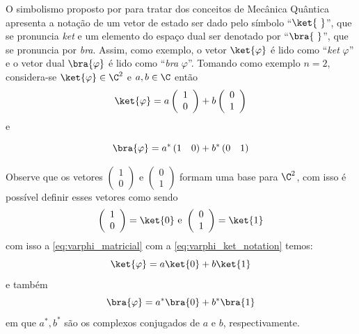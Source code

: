 O simbolismo proposto por \textcite{dirac1981principles} para tratar dos conceitos de Mecânica Quântica apresenta a notação de um vetor de estado ser dado pelo símbolo ``$\ket{\ }$'', que se pronuncia \textit{ket} e um elemento do espaço dual ser denotado por ``$\bra{\ }$'', que se pronuncia por \textit{bra}. Assim, como exemplo, o vetor $\ket{\varphi}$ é lido como ``\textit{ket} $\varphi$'' e o vetor dual $\bra{\varphi}$ é lido como ``\textit{bra} $\varphi$''. Tomando como exemplo $n=2$, considera-se $\ket{\varphi}\in\C^2$ e $a,b\in\C$ então
\begin{equation}\label{eq:varphi_matricial}
    \ket{\varphi}=a\left(\begin{array}{c}
         1 \\ 
         0
    \end{array}\right)+b\left(\begin{array}{c}
         0 \\
         1
    \end{array}\right)
\end{equation}
\noindent e 

\begin{equation}\label{eq:bra_varphi_matricial}
\bra{\varphi}=a^*\left(1\quad 0\right) + b^*\left(0\quad 1\right)
\end{equation}

Observe que os vetores $\left(\begin{array}{c}
         1 \\ 
         0
    \end{array}\right)$ e $\left(\begin{array}{c}
         0 \\
         1
    \end{array}\right)$ formam uma base para $\C^2$, com isso é possível definir esses vetores como sendo
\begin{equation}\label{eq:varphi_ket_notation}
\left(\begin{array}{c}
     1 \\
     0
\end{array}\right)=\ket{0}\text{ e }\left(\begin{array}{c}
     0 \\
     1
\end{array}\right)=\ket{1}
\end{equation}
com isso a \autoref{eq:varphi_matricial} com a \autoref{eq:varphi_ket_notation} temos:
$$\ket{\varphi}=a\ket{0}+b\ket{1}$$
\noindent e também 
$$\bra{\varphi}=a^*\bra{0}+b^*\bra{1}$$
\noindent em que $a^*, b^*$ são os complexos conjugados de $a$ e $b$, respectivamente.

